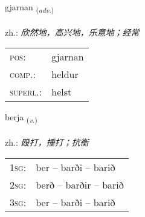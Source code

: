 \documentclass[frontgrid, backgrid]{flacards}\usepackage[]{graphicx}\usepackage[]{xcolor}
\begin{document}
\renewcommand{\flhead}{\vskip5pt \fboxsep=0pt {\small\bfseries\footnotesize Atviksorð | 副词}}
\renewcommand{\fcfoot}{\vskip5pt \fboxsep=0pt \hspace{2pt}{\small\bfseries\footnotesize 1K}}

\renewcommand{\blhead}{\vskip5pt {\small\bfseries\footnotesize Atviksorð | 副词 }}
\renewcommand{\bcfoot}{\vskip5pt \hspace{2pt}{\small\bfseries\footnotesize 1K}}


{gjarnan \small{\textsubscript{(\textit{adv.})}} \\[1ex] %
\textphonetic{[cartnan]} \\
zh.: \emph{欣然地，高兴地，乐意地；经常} \\  [2ex]
\renewcommand*{\arraystretch}{0.8}
\begin{tabular}{ll}
\textsc{pos}: & gjarnan \\ 
\textsc{comp.}: & heldur \\ 
\textsc{superl.}: & helst \\
\end{tabular}
}

\renewcommand{\flhead}{\vskip5pt \fboxsep=0pt {\small\bfseries\footnotesize Sagnorð | 动词}}
\renewcommand{\fcfoot}{\vskip5pt \fboxsep=0pt \hspace{2pt}{\small\bfseries\footnotesize 1K}}

\renewcommand{\blhead}{\vskip5pt {\small\bfseries\footnotesize Sagnorð | 动词 }}
\renewcommand{\bcfoot}{\vskip5pt \hspace{2pt}{\small\bfseries\footnotesize 1K}}


{berja \small{\textsubscript{(\textit{v.})}} \\[1ex] %
\textphonetic{[pɛrja]} \\
zh.: \emph{殴打，捶打；抗衡} \\  [2ex]
\renewcommand*{\arraystretch}{0.8}
\begin{tabular}{p{1cm}l}
\textsc{1sg}: & ber -- barði -- barið \\ 
\textsc{2sg}: & berð -- barðir -- barið \\ 
\textsc{3sg}: & ber -- barði -- barið \\ 
\end{tabular}
}
\end{document}
